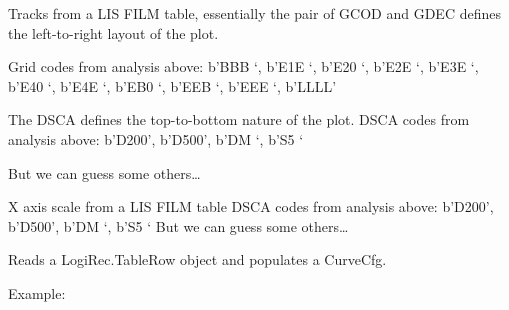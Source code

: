 \documentclass[letterpaper,10pt,english]{sphinxmanual}
\begin{document}

\begin{fulllineitems}
\label{\detokenize{ref/util/plot/FILMCfg:TotalDepth.util.plot.FILMCfg.PhysFilmCfgLISRead}}
Tracks from a LIS FILM table, essentially the pair of GCOD and GDEC
defines the left-to-right layout of the plot.

Grid codes from analysis above:
b’BBB ‘,  b’E1E ‘, b’E20 ‘, b’E2E ‘, b’E3E ‘, b’E40 ‘, b’E4E ‘, b’EB0 ‘, b’EEB ‘, b’EEE ‘, b’LLLL’

The DSCA defines the top-to-bottom nature of the plot. 
DSCA codes from analysis above:
b’D200’, b’D500’, b’DM  ‘, b’S5  ‘

But we can guess some others…

\begin{fulllineitems}
\label{\detokenize{ref/util/plot/FILMCfg:TotalDepth.util.plot.FILMCfg.PhysFilmCfgLISRead.DSCA_MAP}}
X axis scale from a LIS FILM table
DSCA codes from analysis above:
b’D200’, b’D500’, b’DM  ‘, b’S5  ‘
But we can guess some others…

\end{fulllineitems}


\begin{fulllineitems}
\label{\detokenize{ref/util/plot/FILMCfg:TotalDepth.util.plot.FILMCfg.PhysFilmCfgLISRead.__init__}}
Reads a LogiRec.TableRow object and populates a CurveCfg.

Example:

\begin{sphinxVerbatim}[commandchars=\\\{\}]
        
             
\end{sphinxVerbatim}


\end{fulllineitems}
\end{fulllineitems}
\end{document}
